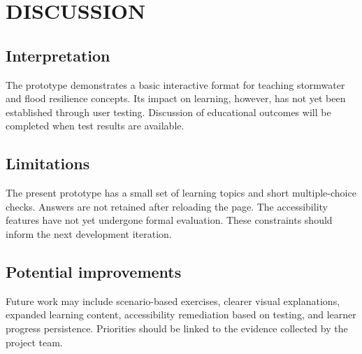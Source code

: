 \chapter{DISCUSSION}
\section{Interpretation}
The prototype demonstrates a basic interactive format for teaching stormwater and flood resilience concepts. Its impact on learning, however, has not yet been established through user testing. Discussion of educational outcomes will be completed when test results are available.

\section{Limitations}
The present prototype has a small set of learning topics and short multiple-choice checks. Answers are not retained after reloading the page. The accessibility features have not yet undergone formal evaluation. These constraints should inform the next development iteration.

\section{Potential improvements}
Future work may include scenario-based exercises, clearer visual explanations, expanded learning content, accessibility remediation based on testing, and learner progress persistence. Priorities should be linked to the evidence collected by the project team.
